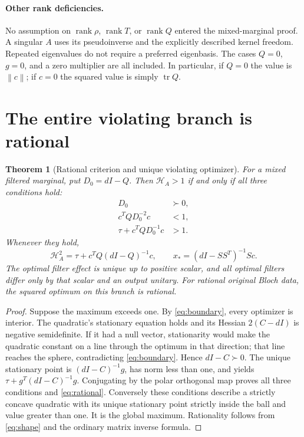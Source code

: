 \documentclass[11pt]{article}
\newtheorem{theorem}{Theorem}
\theoremstyle{remark}\newtheorem{remark}[theorem]{Remark}
\newcommand{\tr}{\operatorname{tr}}
\newcommand{\HF}{\mathcal H}
\newcommand{\norm}[1]{\left\lVert#1\right\rVert}
\begin{document}
\paragraph{Other rank deficiencies.}
No assumption on $\operatorname{rank}\rho$, $\operatorname{rank}T$, or
$\operatorname{rank}Q$ entered the mixed-marginal proof. A singular $A$ uses
its pseudoinverse and the explicitly described kernel freedom. Repeated
eigenvalues do not require a preferred eigenbasis. The cases $Q=0$, $g=0$,
and a zero multiplier are all included. In particular, if $Q=0$ the value
is $\norm c$; if $c=0$ the squared value is simply $\tr Q$.

\section{The entire violating branch is rational}

\begin{theorem}[Rational criterion and unique violating optimizer]\label{thm:violation}
For a mixed filtered marginal, put $D_0=dI-Q$. Then $\HF_A>1$ if and only if
all three conditions hold:
\begin{align}\label{eq:criterion}
 D_0&\succ0,\\
 c^TQD_0^{-2}c&<1,\nonumber\\
 \tau+c^TQD_0^{-1}c&>1.\nonumber
\end{align}
Whenever they hold,
\begin{equation}\label{eq:rational}\boxed{
 \HF_A^2=\tau+c^TQ(dI-Q)^{-1}c,\qquad
 x_*=(dI-SS^T)^{-1}Sc.}
\end{equation}
The optimal filter effect is unique up to positive scalar, and all optimal
filters differ only by that scalar and an output unitary. For rational
original Bloch data, the squared optimum on this branch is rational.
\end{theorem}
\begin{proof}
Suppose the maximum exceeds one. By \eqref{eq:boundary}, every optimizer
is interior. The quadratic's stationary equation holds and its Hessian
$2(C-dI)$ is negative semidefinite. If it had a null vector, stationarity
would make the quadratic constant on a line through the optimum in that
direction; that line reaches the sphere, contradicting
\eqref{eq:boundary}. Hence $dI-C\succ0$. The unique stationary point is
$(dI-C)^{-1}g$, has norm less than one, and yields
$\tau+g^T(dI-C)^{-1}g$. Conjugating by the polar orthogonal map proves
all three conditions and \eqref{eq:rational}.
Conversely these conditions describe a strictly concave quadratic with its
unique stationary point strictly inside the ball and value greater than one.
It is the global maximum. Rationality follows from \eqref{eq:shape} and
the ordinary matrix inverse formula.
\end{proof}
\end{document}
